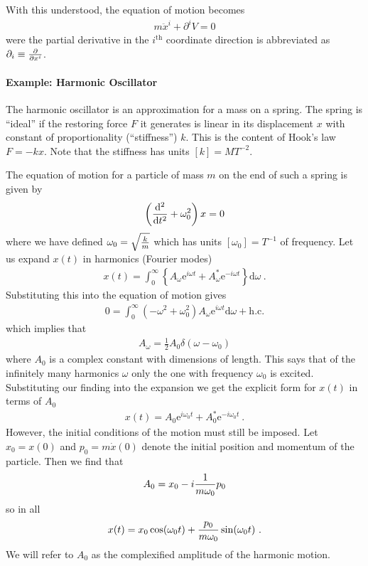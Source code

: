 \documentclass[12pt]{article}
\begin{document}
With this understood, the equation of motion becomes
\begin{eqnarray}
m\ddot x^i+\partial^i V=0
\end{eqnarray}
were the partial derivative in the $i^\mathrm{th}$ coordinate direction is abbreviated as $\partial_i\equiv{\partial \over \partial x^i}$.

\paragraph{Example: Harmonic Oscillator} The harmonic oscillator is an approximation for a mass on a spring. The spring is ``ideal'' if the restoring force $F$ it generates is linear in its displacement $x$ with constant of proportionality (``stiffness'') $k$. This is the content of Hook's law $F=-k x$. Note that the stiffness has units $[k]=MT^{-2}$.

The equation of motion for a particle of mass $m$ on the end of such a spring is given by 
\begin{eqnarray}
\left({\mathrm d^2\over \mathrm d t^2}+\omega_0^2\right)x=0
\end{eqnarray}
where we have defined $\omega_0=\sqrt{k\over m}$ which has units $[\omega_0]=T^{-1}$ of frequency. Let us expand $x(t)$ in harmonics (Fourier modes)
\begin{eqnarray}
x(t)=%
\int_{0}^{\infty} \left\{A_\omega \mathrm e^{i\omega t}+A^*_\omega \mathrm e^{-i\omega t}\right\}\mathrm d\omega~.
\end{eqnarray}
Substituting this into the equation of motion gives
\begin{eqnarray}
0=%
\int_{0}^{\infty}(-\omega^2+\omega_0^2) %
A_\omega\mathrm e^{i\omega t}
\mathrm d \omega  +\mathrm{h.c.}
\end{eqnarray}
which implies that 
\begin{eqnarray}
A_\omega=\frac12 A_0 \delta(\omega-\omega_0)
\end{eqnarray}
 where $A_0$ is a complex constant with dimensions of length. This says that of the infinitely many harmonics $\omega$ only the one with frequency $\omega_0$ is excited. Substituting our finding into the expansion we get the explicit form for $x(t)$ in terms of $A_0$ 
\begin{eqnarray}
x(t)=A_0 \mathrm e^{i\omega_0 t}+A_0^* \mathrm e^{-i\omega_0 t}~.
\end{eqnarray} 
However, the initial conditions of the motion must still be imposed. Let $x_0=x(0)$ and $p_0=m\dot x(0)$  denote the initial position and momentum of the particle. Then we find that 
\begin{eqnarray}
\label{A0}
A_0=x_0-i{1\over m \omega_0}p_0
\end{eqnarray} 
so in all
\begin{eqnarray}
x(t)=x_0 \cos(\omega_0 t)+{p_0\over m \omega_0}\sin(\omega_0 t)~.
\end{eqnarray}
We will refer to $A_0$ as the complexified amplitude of the harmonic motion. 
\end{document}
